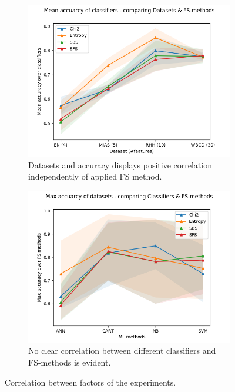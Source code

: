 \begin{figure}[ht]
  \centering
    \begin{subfigure}[b]{0.475\textwidth}
        \centering
        \includegraphics[width=\textwidth]{../plots_with_std_fill/comp_acc_datasets.png}
        \caption[]%
        {{\small Datasets and accuracy displays positive correlation independently of applied FS method.}}
        \label{fig:comp_acc_datasets}
    \end{subfigure}
  \hfill
    \begin{subfigure}[b]{0.475\textwidth}
        \centering
        \includegraphics[width=\textwidth]{../plots_with_std_fill/comp_classif_datasets.png}
        \caption[]%
        {{\small No clear correlation between different classifiers and FS-methods is evident.}}
        \label{fig:comp_classif_datasets}
    \end{subfigure}
  \caption[]
  {\small Correlation between factors of the experiments.}
  \label{fig:anova_plots}
\end{figure}
